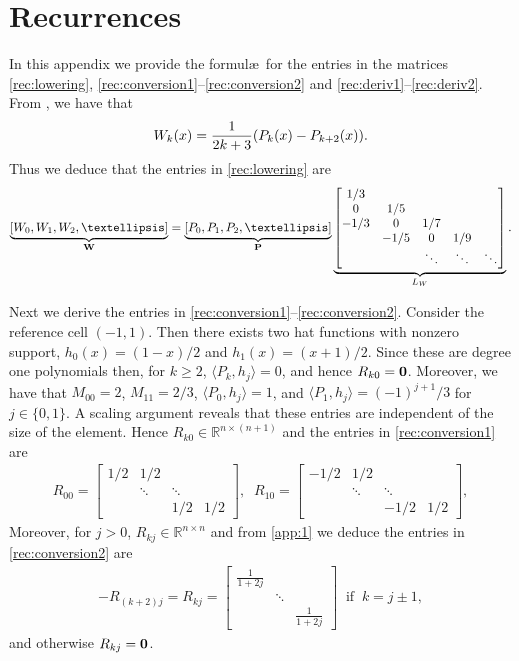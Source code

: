 \documentclass[hidelinks,onefignum,onetabnum]{siamart220329}
\def\bfP{{\bf P}}
\def\bfW{{\bf W}}
\begin{document}



\appendix

\section{Recurrences}\label{Appendix:Recurrences}

In this appendix we provide the formul\ae\ for the entries in the matrices \cref{rec:lowering}, \cref{rec:conversion1}--\cref{rec:conversion2} and \cref{rec:deriv1}--\cref{rec:deriv2}.
From  \cite[18.9.8]{DLMF}, we have that
\begin{align}
W_k(x) = {1 \over 2k+3}(P_k(x) - P_{k+2}(x)). \label{app:1}
\end{align}
Thus we deduce that the entries in \cref{rec:lowering} are
\[
\underbrace{[W_0,W_1,W_2,\ensuremath{\ldots}]}_\bfW = \underbrace{[P_0,P_1,P_2,\ensuremath{\ldots}]}_\bfP \underbrace{\begin{bmatrix} 1/3 \\ 0 & 1/5 \\ -1/3 & 0 & 1/7 \\ &-1/5 &0 & 1/9 \\ &&\ensuremath{\ddots} & \ensuremath{\ddots} & \ensuremath{\ddots} 
\end{bmatrix}}_{L_W}.
\]

Next we derive the entries in \cref{rec:conversion1}--\cref{rec:conversion2}. Consider the reference cell $(-1,1)$. Then there exists two hat functions with nonzero support, $h_0(x) = (1-x)/2$ and $h_1(x) = (x+1)/2$. Since these are degree one polynomials then, for $k \geq 2$, $\langle P_k, h_j \rangle = 0$, and hence $R_{k0} = {\bf 0}$. Moreover, we have that $M_{00} =2$, $M_{11} = 2/3$, $\langle P_0, h_j \rangle = 1$, and $\langle P_1, h_j \rangle = (-1)^{j+1}/3$ for $j \in \{0,1\}$. A scaling argument reveals that these entries are independent of the size of the element. Hence $R_{k0} \in \mathbb{R}^{n \times(n+1)}$ and the entries in \cref{rec:conversion1} are
\begin{align}
R_{00} = 
\begin{bmatrix}
1/2 & 1/2 & &\\
& \ddots & \ddots & \\
& & 1/2 & 1/2
\end{bmatrix},
\;\;
R_{10} = 
\begin{bmatrix}
-1/2 & 1/2 & &\\
& \ddots & \ddots & \\
& & -1/2 & 1/2
\end{bmatrix},
\end{align}
Moreover, for $j > 0$, $R_{kj} \in \mathbb{R}^{n \times n}$ and from \cref{app:1} we deduce the entries in \cref{rec:conversion2} are
\begin{align}
-R_{(k+2)j} = R_{kj} = 
\begin{bmatrix}
\frac{1}{1+2j} & &\\
& \ddots & \\
& &   \frac{1}{1+2j}  
\end{bmatrix} \;\; \text{if} \;\; k = j \pm 1,
\end{align}
and otherwise $R_{kj} = {\bf 0}$.
\end{document}
